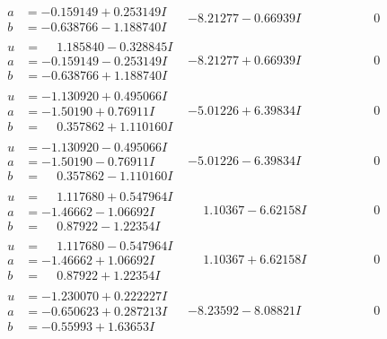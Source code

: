 \documentclass[1p]{elsarticle_modified}
\theoremstyle{definition}
\begin{document}
$$\begin{array}{c|c|c}
\begin{aligned}
a &= -0.159149 + 0.253149 I \\
b &= -0.638766 - 1.188740 I\end{aligned}
 & -8.21277 - 0.66939 I & \phantom{-0.000000 } 0 \\ \hline\begin{aligned}
u &= \phantom{-}1.185840 - 0.328845 I \\
a &= -0.159149 - 0.253149 I \\
b &= -0.638766 + 1.188740 I\end{aligned}
 & -8.21277 + 0.66939 I & \phantom{-0.000000 } 0 \\ \hline\begin{aligned}
u &= -1.130920 + 0.495066 I \\
a &= -1.50190 + 0.76911 I \\
b &= \phantom{-}0.357862 + 1.110160 I\end{aligned}
 & -5.01226 + 6.39834 I & \phantom{-0.000000 } 0 \\ \hline\begin{aligned}
u &= -1.130920 - 0.495066 I \\
a &= -1.50190 - 0.76911 I \\
b &= \phantom{-}0.357862 - 1.110160 I\end{aligned}
 & -5.01226 - 6.39834 I & \phantom{-0.000000 } 0 \\ \hline\begin{aligned}
u &= \phantom{-}1.117680 + 0.547964 I \\
a &= -1.46662 - 1.06692 I \\
b &= \phantom{-}0.87922 - 1.22354 I\end{aligned}
 & \phantom{-}1.10367 - 6.62158 I & \phantom{-0.000000 } 0 \\ \hline\begin{aligned}
u &= \phantom{-}1.117680 - 0.547964 I \\
a &= -1.46662 + 1.06692 I \\
b &= \phantom{-}0.87922 + 1.22354 I\end{aligned}
 & \phantom{-}1.10367 + 6.62158 I & \phantom{-0.000000 } 0 \\ \hline\begin{aligned}
u &= -1.230070 + 0.222227 I \\
a &= -0.650623 + 0.287213 I \\
b &= -0.55993 + 1.63653 I\end{aligned}
 & -8.23592 - 8.08821 I & \phantom{-0.000000 } 0 \\ \hline\begin{aligned}

\end{aligned}
\end{array}$$
\end{document}
